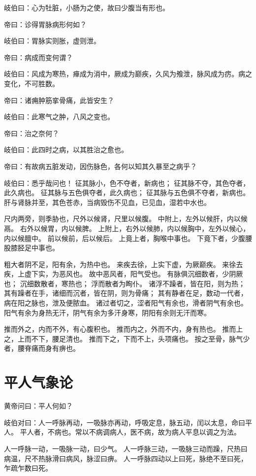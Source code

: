 \documentclass{article}%
\begin{document}
岐伯曰：心为牡脏，小肠为之使，故曰少腹当有形也。

帝曰：诊得胃脉病形何如？

岐伯曰：胃脉实则胀，虚则泄。

帝曰：病成而变何谓？

岐伯曰：风成为寒热，瘅成为消中，厥成为巅疾，久风为飧泄，脉风成为疠。病之变化，不可胜数。

帝曰：诸痈肿筋挛骨痛，此皆安生？

岐伯曰：此寒气之肿，八风之变也。

帝曰：治之奈何？

岐伯曰：此四时之病，以其胜治之愈也。

帝曰：有故病五脏发动，因伤脉色，各何以知其久暴至之病乎？

岐伯曰：悉乎哉问也！
征其脉小，色不夺者，新病也；
征其脉不夺，其色夺者，此久病也。
征其脉与五色俱夺者，此久病也；
征其脉与五色俱不夺者，新病也。
肝与肾脉并至，其色苍赤，当病毁伤不见血，已见血，湿若中水也。

尺内两旁，则季胁也，尺外以候肾，尺里以候腹。
中附上，左外以候肝，内以候鬲。
右外以候胃，内以候脾。
上附上，右外以候肺，内以候胸中，左外以候心，内以候膻中。
前以候前，后以候后。
上竟上者，胸喉中事也。
下竟下者，少腹腰股膝胫足中事也。

粗大者阴不足，阳有余，为热中也。
来疾去徐，上实下虚，为厥巅疾。
来徐去疾，上虚下实，为恶风也。
故中恶风者，阳气受也。
有脉俱沉细数者，少阴厥也；
沉细数散者，寒热也；
浮而散者为眴仆。
诸浮不躁者，皆在阳，则为热；
其有躁者在手，诸细而沉者，皆在阴，则为骨痛；
其有静者在足，数动一代者，病在阳之脉也，泄及便脓血。
诸过者切之，涩者阳气有余也，滑者阴气有余也。
阳气有余为身热无汗，阴气有余为多汗身寒，阴阳有余则无汗而寒。

推而外之，内而不外，有心腹积也。
推而内之，外而不内，身有热也。
推而上之，上而不下，腰足清也。
推而下之，下而不上，头项痛也。
按之至骨，脉气少者，腰脊痛而身有痹也。


\section{平人气象论}

黄帝问曰：平人何如？

岐伯对曰：人一呼脉再动，一吸脉亦再动，呼吸定息，脉五动，闰以太息，命曰平人。
平人者，不病也。常以不病调病人，医不病，故为病人平息以调之为法。

人一呼脉一动，一吸脉一动，曰少气。
人一呼脉三动，一吸脉三动而躁，尺热曰病温，尺不热脉滑曰病风，脉涩曰痹。
人一呼脉四动以上曰死，脉绝不至曰死，乍疏乍数曰死。
\end{document}
